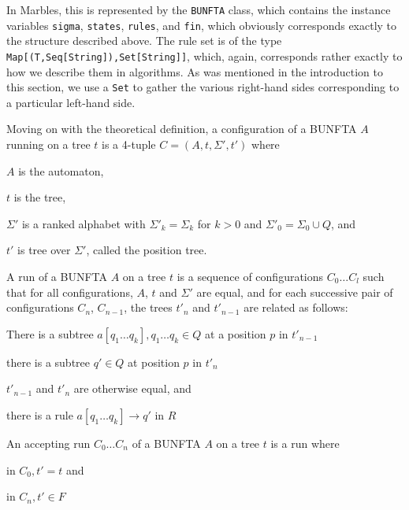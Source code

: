 In Marbles, this is represented by the \texttt{BUNFTA} class, which
contains the instance variables \texttt{sigma}, \texttt{states},
\texttt{rules}, and \texttt{fin}, which obviously corresponds exactly to
the structure described above. The rule set is of the type
\texttt{Map[(T,Seq[String]),Set[String]]}, which, again, corresponds rather
exactly to how we describe them in algorithms. As was mentioned in the
introduction to this section, we use a \texttt{Set} to gather the various
right-hand sides corresponding to a particular left-hand side.

Moving on with the theoretical definition, a configuration of a BUNFTA $A$
running on a tree $t$ is a 4-tuple
$C = (A, t, \Sigma', t')$ where
\begin{compactitem}
\item $A$ is the automaton,
\item $t$ is the tree,
\item $\Sigma'$ is a ranked alphabet with $\Sigma'_k = \Sigma_k$ for $k >
$0 and $\Sigma'_0 = \Sigma_0 \cup Q$, and
\item $t'$ is tree over $\Sigma'$, called the position tree.
\end{compactitem}
\vspace{0.5cm}

A run of a BUNFTA $A$ on a tree $t$ is a sequence of configurations $C_0
\ldots C_l$ such that for all configurations, $A$, $t$ and $\Sigma'$ are
equal, and for each successive pair of configurations $C_n$, $C_{n-1}$, the
trees $t'_n$ and $t'_{n-1}$ are related as follows: 
\begin{compactitem}
\item There is a subtree $a[q_1 \ldots q_k], q_1 \ldots q_k \in Q$ at a position $p$ in $t'_{n-1}$
\item there is a subtree $q'\in Q$ at position $p$ in $t'_n$
\item $t'_{n-1}$ and $t'_n$ are otherwise equal, and
\item there is a rule $a[q_1 \ldots q_k] \rightarrow q'$ in $R$
\end{compactitem}
\vspace{0.5cm}

An accepting run ${C_0 \ldots C_n}$ of a BUNFTA $A$ on a tree $t$ is a run where
\begin{compactitem}
\item in $C_0, t' = t$ and
\item in $C_n, t' \in F$ %
\end{compactitem}
\vspace{0.5cm}

